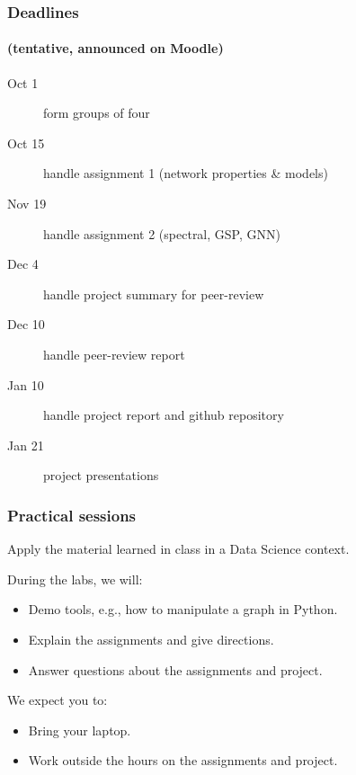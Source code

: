 \documentclass[aspectratio=169]{beamer}
\begin{document}

\begin{frame}
	\frametitle{Deadlines}
	\framesubtitle{(tentative, announced on Moodle)}
	\begin{description}
		\item[Oct 1] form groups of four %
		\vfill
		\item[Oct 15] handle assignment 1 (network properties \& models)
		\vfill
		\item[Nov 19] handle assignment 2 (spectral, GSP, GNN)
		\vfill
		\item[Dec 4] handle project summary for peer-review
		\vfill
		\item[Dec 10] handle peer-review report
		\vfill
		\item[Jan 10] handle project report and github repository
		\vfill
		\item[Jan 21] project presentations
	\end{description}
\end{frame}


\begin{frame}
	\frametitle{Practical sessions}
	\begin{center}
		Apply the material learned in class in a Data Science context.
	\end{center}
	\vfill
	During the labs, we will:
	\begin{itemize}
		\item Demo tools, e.g., how to manipulate a graph in Python.
		\item Explain the assignments and give directions.
		\item Answer questions about the assignments and project.
	\end{itemize}
	\vfill
	We expect you to:
	\begin{itemize}
		\item Bring your laptop.
		\item Work outside the hours on the assignments and project.
	\end{itemize}
\end{frame}

\end{document}
